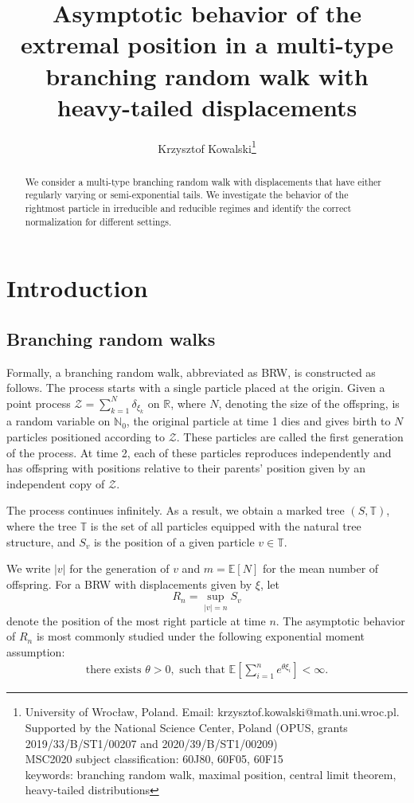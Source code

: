 \documentclass[12pt]{article}
\title{Asymptotic behavior of the extremal position in a multi-type branching random walk with heavy-tailed displacements}
\author{Krzysztof Kowalski\footnote{University of Wrocław, Poland. Email: krzysztof.kowalski@math.uni.wroc.pl. Supported by the National Science Center, Poland (OPUS, grants 2019/33/B/ST1/00207 and 2020/39/B/ST1/00209)
\\ MSC2020 subject classification: 60J80, 60F05, 60F15
\\ keywords: branching random walk, maximal position, central limit theorem, heavy-tailed distributions}}
\numberwithin{equation}{section}
\newcommand{\R}{\mathbb{R}}
\begin{document}
\maketitle
\begin{abstract}
    We consider a multi-type branching random walk with displacements that have either regularly varying or semi-exponential tails. We investigate the behavior of the rightmost particle in irreducible and reducible regimes and identify the correct normalization for different settings. 
\end{abstract}

\tableofcontents

\section{Introduction}

\subsection{Branching random walks}Formally, a branching random walk, abbreviated as BRW, is constructed as follows. The process starts with a single particle placed at the origin. Given a point process ${\mathcal Z} = \sum_{k=1}^N \delta_{\xi_k}$ on $\R$, where $N$, denoting the size of the offspring, is a random variable on $\mathbb{N}_0$, the original particle at time 1 dies and gives birth to $N$ particles positioned according to ${\mathcal Z}$. 
These particles are called the first generation of the process. At time 2, each of these particles reproduces independently
and has offspring with positions relative to their parents' position given by an independent copy of ${\mathcal Z}$. 

The process continues infinitely. As a result, we obtain a marked tree $\left(S, \mathbb{T}\right)$, where the tree $\mathbb{T}$ is the set of all particles equipped with the natural tree structure, and $S_v$ is the position of a given particle $v \in \mathbb{T}$.

We write $|v|$ for the generation of $v$ and $m=\mathbb{E}[N]$ for the mean number of offspring. For a BRW with displacements given by $\xi$,
let \[R_n = \sup_{|v|=n} S_v\] denote the position of the most right particle at time $n$. The asymptotic behavior of $R_n$ is most commonly studied under the following exponential moment assumption:
\begin{align}\label{ExponentialMoment}
    \text{there exists } \theta >0, \text{ such that } \mathbb{E}\left[ \sum_{i=1}^n e^{\theta \xi_i} \right] < \infty.
\end{align} 
\end{document}

